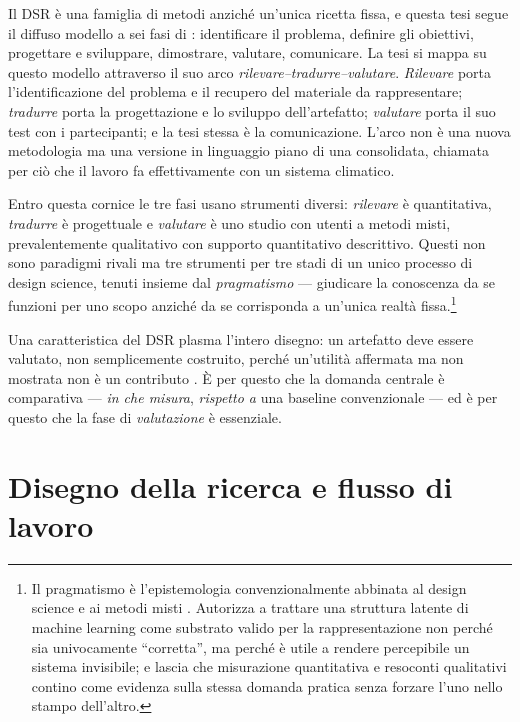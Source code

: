 Il DSR è una famiglia di metodi anziché un'unica ricetta fissa, e questa tesi segue il diffuso modello a sei fasi di \citet{peffers2007}: identificare il problema, definire gli obiettivi, progettare e sviluppare, dimostrare, valutare, comunicare. La tesi si mappa su questo modello attraverso il suo arco \emph{rilevare--tradurre--valutare}. \emph{Rilevare} porta l'identificazione del problema e il recupero del materiale da rappresentare; \emph{tradurre} porta la progettazione e lo sviluppo dell'artefatto; \emph{valutare} porta il suo test con i partecipanti; e la tesi stessa è la comunicazione. L'arco non è una nuova metodologia ma una versione in linguaggio piano di una consolidata, chiamata per ciò che il lavoro fa effettivamente con un sistema climatico.

Entro questa cornice le tre fasi usano strumenti diversi: \emph{rilevare} è quantitativa, \emph{tradurre} è progettuale e \emph{valutare} è uno studio con utenti a metodi misti, prevalentemente qualitativo con supporto quantitativo descrittivo. Questi non sono paradigmi rivali ma tre strumenti per tre stadi di un unico processo di design science, tenuti insieme dal \emph{pragmatismo} --- giudicare la conoscenza da se funzioni per uno scopo anziché da se corrisponda a un'unica realtà fissa.\footnote{Il pragmatismo è l'epistemologia convenzionalmente abbinata al design science e ai metodi misti \citep{peffers2007}. Autorizza a trattare una struttura latente di machine learning come substrato valido per la rappresentazione non perché sia univocamente ``corretta'', ma perché è utile a rendere percepibile un sistema invisibile; e lascia che misurazione quantitativa e resoconti qualitativi contino come evidenza sulla stessa domanda pratica senza forzare l'uno nello stampo dell'altro.}

Una caratteristica del DSR plasma l'intero disegno: un artefatto deve essere valutato, non semplicemente costruito, perché un'utilità affermata ma non mostrata non è un contributo \citep{hevner2004}. È per questo che la domanda centrale è comparativa --- \emph{in che misura}, \emph{rispetto a} una baseline convenzionale --- ed è per questo che la fase di \emph{valutazione} è essenziale.

\section{Disegno della ricerca e flusso di lavoro}
\label{sec:workflow}

